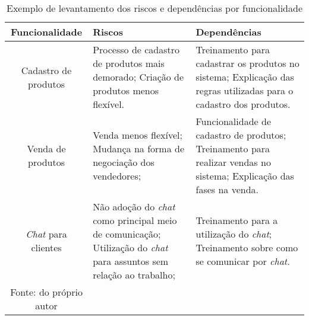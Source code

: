       \begin{table}[h!]
        \label{Tabela:3}
        \caption{Exemplo de levantamento dos riscos e dependências por funcionalidade}
        \begin{tabular}{c p{4cm} p{4cm}}
          \hline
          \textbf{Funcionalidade} &
          \textbf{Riscos}  &
          \textbf{Dependências}
          \\ \hline
          Cadastro de produtos &
          Processo de cadastro de produtos mais demorado; \newline
          Criação de produtos menos flexível. &
          Treinamento para cadastrar os produtos no sistema;\newline
          Explicação das regras utilizadas para o cadastro dos produtos.
          \\
          Venda de produtos &
          Venda menos flexível; \newline
          Mudança na forma de negociação dos vendedores; &
          Funcionalidade de cadastro de produtos; \newline
          Treinamento para realizar vendas no sistema; \newline
          Explicação das fases na venda.
          \\
          \textit{Chat} para clientes &
          Não adoção do \textit{chat} como principal meio de comunicação; \newline
          Utilização do \textit{chat} para assuntos sem relação ao trabalho; &
          Treinamento para a utilização do \textit{chat}; \newline
          Treinamento sobre como se comunicar por \textit{chat}.
          \\ \hline
          \newline
          \small{Fonte: do próprio autor}
        \end{tabular}
      \end{table}

